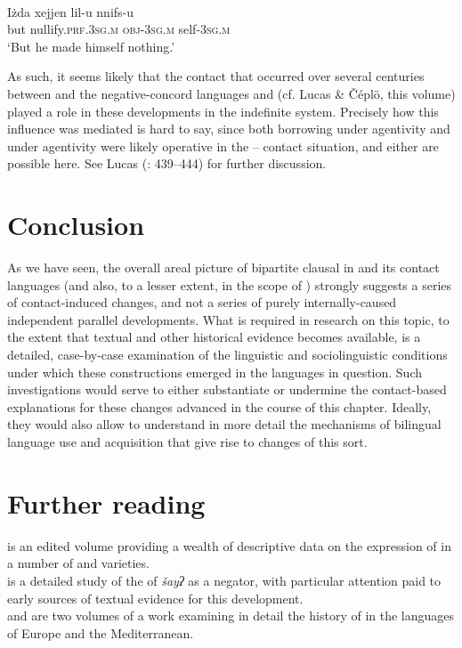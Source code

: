 \documentclass[output=paper]{langsci/langscibook}
\begin{document}
\ea\label{ex:mlt1}
{        \citep[441]{Lucas2013}}\\
\gll Iżda xejjen lil-u nnifs-u\\
     but nullify.\textsc{prf.3sg.m} \textsc{obj-3sg.m} self-\textsc{3sg.m}\\
\glt ‘But he made himself nothing.’
\z

As such, it seems likely that the  contact that occurred over several centuries between  and the negative-concord languages  and  (cf. Lucas \& Čéplö, this volume) played a role in these developments in the  indefinite system. Precisely how this influence was mediated is hard to say, since both borrowing under  agentivity and  under  agentivity were likely operative in the – contact situation, and either are possible here. See Lucas (\citeyear{Lucas2013}: 439–444) for further discussion.

\section{Conclusion}

As we have seen, the overall areal picture of bipartite clausal  in  and its contact languages (and also, to a lesser extent,  in the scope of ) strongly suggests a series of contact-induced changes, and not a series of purely internally-caused independent parallel developments. What is required in  research on this topic, to the extent that textual and other historical evidence becomes available, is a detailed, case-by-case examination of the linguistic and sociolinguistic conditions under which these constructions emerged in the languages in question. Such investigations would serve to either substantiate or undermine the contact-based explanations for these changes advanced in the course of this chapter. Ideally, they would also allow to understand in more detail the mechanisms of bilingual language use and acquisition that give rise to changes of this sort.

\section*{Further reading}

\citet{ChakerCaubet1996} is an edited volume providing a wealth of descriptive data on the expression of  in a number of  and   varieties.\\
\citet{Diem2014} is a detailed study of the  of  \textit{šayʔ} as a negator, with particular attention paid to early sources of textual evidence for this development.\\
\citet{WillisBreitbarth2013} and \citet{BreitbarthWillisLucasinpress} are two volumes of a work examining in detail the history of  in the languages of Europe and the Mediterranean.
\end{document}
